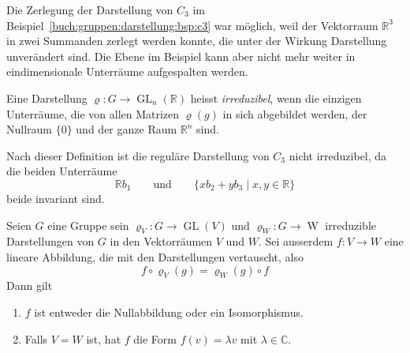 Die Zerlegung der Darstellung von $C_3$ im 
Beispiel~\ref{buch:gruppen:darstellung:bsp:c3} war möglich, weil
der Vektorraum $\mathbb{R}^3$ in zwei Summanden zerlegt werden 
konnte, die unter der Wirkung Darstellung unverändert sind.
Die Ebene im Beispiel kann aber nicht mehr weiter in eindimensionale
Unterräume aufgespalten werden.

\begin{definition}
\label{buch:gruppen:darstellung:def:irreduzibel}
Eine Darstellung $\varrho\colon G\to \operatorname{GL}_n(\mathbb{R})$ 
heisst {\em irreduzibel}, wenn die einzigen Unterräume, die von allen
Matrizen $\varrho(g)$ in sich abgebildet werden, der Nullraum $\{0\}$
und der ganze Raum $\mathbb{R}^n$ sind.
\end{definition}

Nach dieser Definition ist die reguläre Darstellung von $C_3$ nicht
irreduzibel, da die beiden Unterräume
\[
\mathbb{R}b_1%
\qquad\text{und}\qquad
\{
xb_2 + yb_3
\mid
x,y\in\mathbb{R}
\}
\]
beide invariant sind.

\begin{satz}
Seien $G$ eine Gruppe sein $\varrho_V\colon G\to \operatorname{GL}(V)$
und $\varrho_W\colon G\to\operatorname{W}$ irreduzible Darstellungen
von $G$ in den Vektorräumen $V$ und $W$.
Sei ausserdem $f\colon V\to W$ eine lineare Abbildung, die mit den
Darstellungen vertauscht, also
\[
f\circ \varrho_V(g) = \varrho_W(g)\circ f
\]
Dann gilt
\begin{enumerate}
\item $f$ ist entweder die Nullabbildung oder ein Isomorphismus.
\item Falls $V=W$ ist, hat $f$ die Form $f(v)=\lambda v$ mit
$\lambda\in \mathbb{C}$.
\end{enumerate}
\end{satz}

